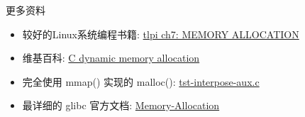 \begin{frame}[fragile]{更多资料}
    \begin{itemize}[<+- | alert@+>]
        \item 较好的Linux系统编程书籍: \href{http://www.man7.org/tlpi/toc-detailed.html#ch_7}{tlpi ch7: MEMORY ALLOCATION}
        \item 维基百科: \href{https://en.wikipedia.org/wiki/C_dynamic_memory_allocation}{C dynamic memory allocation}
        \item 完全使用 mmap() 实现的 malloc(): \href{https://code.woboq.org/userspace/glibc/malloc/tst-interpose-aux.c.html}{tst-interpose-aux.c}
        \item 最详细的 glibc 官方文档: \href{http://www.gnu.org/software/libc/manual/html_mono/libc.html#Memory-Allocation}{Memory-Allocation}
    \end{itemize}
\end{frame}